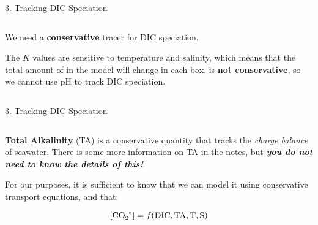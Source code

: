 \begin{frame}{3. Tracking DIC Speciation}

    \begin{columns}
        \begin{column}{0.5\linewidth}
            We need a \textbf{conservative} tracer for DIC speciation.
            \bigskip
        
            The $K$ values are sensitive to temperature and salinity, which means that the total amount of  in the model will change in each box. \ce{[H+]} is \textbf{not conservative}, so we cannot use pH to track DIC speciation.
            \bigskip
        \end{column}


    \end{columns}

\end{frame}

\begin{frame}{3. Tracking DIC Speciation}

    \begin{columns}
        \begin{column}{0.5\linewidth}
            \textbf{Total Alkalinity} (TA) is a conservative quantity that tracks the \textit{charge balance} of seawater. There is some more information on TA in the notes, but \textbf{\textit{you do not need to know the details of this!}}
            \bigskip

            For our purposes, it is sufficient to know that we can model it using conservative transport equations, and that:

            $$
            \ce{[CO_2^*]} = f(\mathrm{DIC, TA, T, S})
            $$
        \end{column}


    \end{columns}
        
\end{frame}

